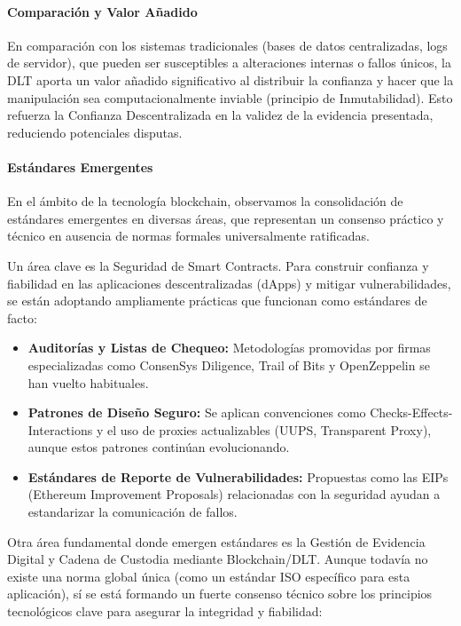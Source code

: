 \paragraph{Comparación y Valor Añadido} En comparación con los sistemas tradicionales (bases de datos centralizadas, logs de servidor), que pueden ser susceptibles a alteraciones internas o fallos únicos, la DLT aporta un valor añadido significativo al distribuir la confianza y hacer que la manipulación sea computacionalmente inviable (principio de Inmutabilidad). Esto refuerza la Confianza Descentralizada en la validez de la evidencia presentada, reduciendo potenciales disputas. 

\paragraph{Estándares Emergentes} En el ámbito de la tecnología blockchain, observamos la consolidación de estándares emergentes en diversas áreas, que representan un consenso práctico y técnico en ausencia de normas formales universalmente ratificadas. 

Un área clave es la Seguridad de Smart Contracts. Para construir confianza y fiabilidad en las aplicaciones descentralizadas (dApps) y mitigar vulnerabilidades, se están adoptando ampliamente prácticas que funcionan como estándares de facto: 
\begin{itemize}
    \item \textbf{Auditorías y Listas de Chequeo:} Metodologías promovidas por firmas especializadas como ConsenSys Diligence, Trail of Bits y OpenZeppelin se han vuelto habituales. 
    \item \textbf{Patrones de Diseño Seguro:} Se aplican convenciones como Checks-Effects-Interactions y el uso de proxies actualizables (UUPS, Transparent Proxy), aunque estos patrones continúan evolucionando. 
    \item \textbf{Estándares de Reporte de Vulnerabilidades:} Propuestas como las EIPs (Ethereum Improvement Proposals) relacionadas con la seguridad ayudan a estandarizar la comunicación de fallos.
\end{itemize}

Otra área fundamental donde emergen estándares es la Gestión de Evidencia Digital y Cadena de Custodia mediante Blockchain/DLT. Aunque todavía no existe una norma global única (como un estándar ISO específico para esta aplicación), sí se está formando un fuerte consenso técnico sobre los principios tecnológicos clave para asegurar la integridad y fiabilidad:

